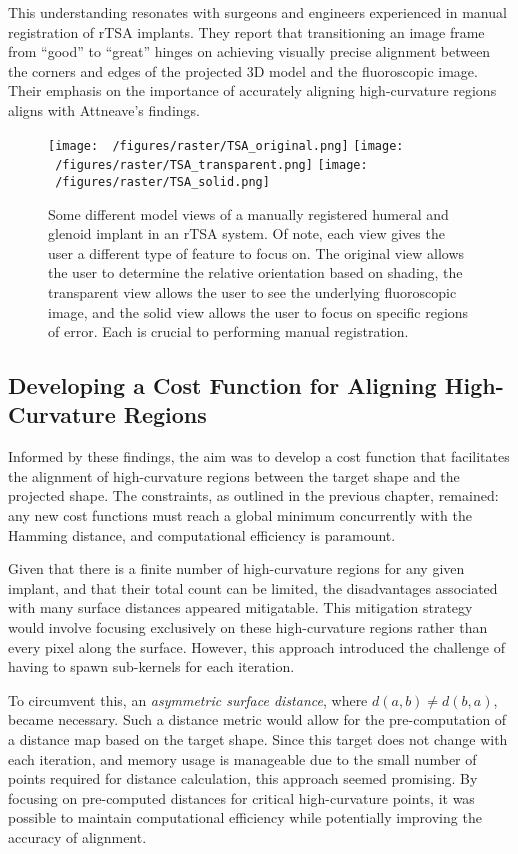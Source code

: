 This understanding resonates with surgeons and engineers experienced in manual registration of rTSA implants.
They report that transitioning an image frame from “good” to “great” hinges on achieving visually precise alignment between the corners and edges of the projected 3D model and the fluoroscopic image.
Their emphasis on the importance of accurately aligning high-curvature regions aligns with Attneave's findings.


\begin{figure}[h!]
  \centering
  \texttt{[image: ~/figures/raster/TSA\_original.png]}
  \texttt{[image: ~/figures/raster/TSA\_transparent.png]}
  \texttt{[image: ~/figures/raster/TSA\_solid.png]}
  \caption{Some different model views of a manually registered humeral and glenoid implant in an rTSA system. Of note, each view gives the user a different type of feature to focus on. The original view allows the user to determine the relative orientation based on shading, the transparent view allows the user to see the underlying fluoroscopic image, and the solid view allows the user to focus on specific regions of error. Each is crucial to performing manual registration.}
  \label{fig:TSA-multiview}
\end{figure}

\subsection{Developing a Cost Function for Aligning High-Curvature Regions}

Informed by these findings, the aim was to develop a cost function that facilitates the alignment of high-curvature regions between the target shape and the projected shape.
The constraints, as outlined in the previous chapter, remained: any new cost functions must reach a global minimum concurrently with the Hamming distance, and computational efficiency is paramount.

Given that there is a finite number of high-curvature regions for any given implant, and that their total count can be limited, the disadvantages associated with many surface distances appeared mitigatable.
This mitigation strategy would involve focusing exclusively on these high-curvature regions rather than every pixel along the surface.
However, this approach introduced the challenge of having to spawn sub-kernels for each iteration.

To circumvent this, an \emph{asymmetric surface distance}, where $d(a,b) \ne d(b,a)$, became necessary.
Such a distance metric would allow for the pre-computation of a distance map based on the target shape.
Since this target does not change with each iteration, and memory usage is manageable due to the small number of points required for distance calculation, this approach seemed promising.
By focusing on pre-computed distances for critical high-curvature points, it was possible to maintain computational efficiency while potentially improving the accuracy of alignment.


